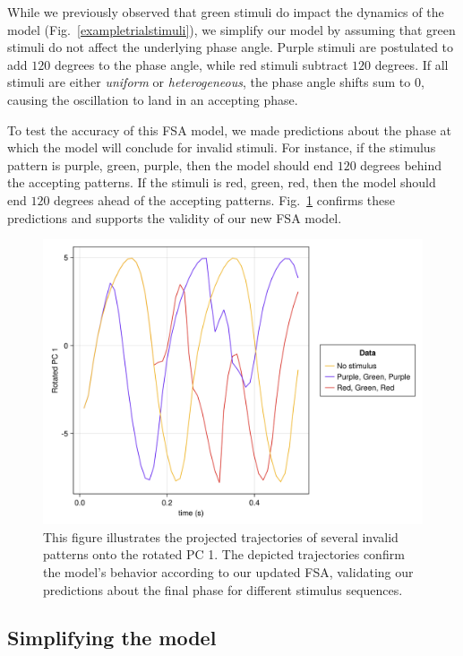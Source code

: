 \documentclass[conference]{IEEEtran}
\begin{document}
While we previously observed that green stimuli do impact the dynamics of the model (Fig.~\ref{exampletrialstimuli}), we simplify our model by assuming that green stimuli do not affect the underlying phase angle. Purple stimuli are postulated to add $120$ degrees to the phase angle, while red stimuli subtract $120$ degrees. If all stimuli are either \textit{uniform} or \textit{heterogeneous}, the phase angle shifts sum to $0$, causing the oscillation to land in an accepting phase.

To test the accuracy of this FSA model, we made predictions about the phase at which the model will conclude for invalid stimuli. For instance, if the stimulus pattern is purple, green, purple, then the model should end $120$ degrees behind the accepting patterns. If the stimuli is red, green, red, then the model should end $120$ degrees ahead of the accepting patterns. Fig.~\ref{pcarejectedsets} confirms these predictions and supports the validity of our new FSA model.

\begin{figure}[htbp]
\centerline{\includegraphics[scale=0.10]{rotated_pc1_rejected.png}}
\caption{This figure illustrates the projected trajectories of several invalid patterns onto the rotated PC 1. The depicted trajectories confirm the model's behavior according to our updated FSA, validating our predictions about the final phase for different stimulus sequences.}
\label{pcarejectedsets}
\end{figure}

\subsection{Simplifying the model}
\end{document}
